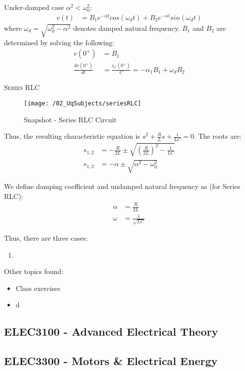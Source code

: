 Under-damped case $\alpha^2 < \omega_0^2$:
\begin{align}
  v(t) &= B_1 e^{-\alpha t} cos (\omega_d t) + B_2 e^{-\alpha t} sin (\omega_d t)
\end{align}
where $\omega_d = \sqrt{\omega_0^2 - \alpha^2}$ denotes damped natural frequency.
$B_1$ and $B_2$ are determined by solving the following:
\begin{align}
  v(0^+) &= B_1 \\
  \frac{dv(0^+)}{dt} &= \frac{i_C(0^+)}{C} = -\alpha_1 B_1 + \omega_d B_2
\end{align}

\textsc{\large Series RLC}\\
\begin{figure}
  \texttt{[image: /02\_UqSubjects/seriesRLC]}
  \caption{Snapshot - Series RLC Circuit}
  \label{fig_seriesRLC}
\end{figure}

Thus, the resulting characteristic equation is $s^2 + \frac{R}{L}s + \frac{1}{LC} = 0$. The roots are:
\begin{align}
  s_{1,2} &= -\frac{R}{2L} \pm \sqrt{(\frac{R}{2L})^2 - \frac{1}{LC}} \\
  s_{1,2} &= -\alpha \pm \sqrt{\alpha^2 - \omega_0^2}
\end{align}

We define damping coefficient and undamped natural frequency as (for Series RLC):
\begin{align}
  \alpha &= \frac{R}{2L} \\
  \omega &= \frac{1}{\sqrt{LC}}
\end{align}

Thus, there are three cases:
\begin{enumerate}
  \item
\end{enumerate}

Other topics found:
\begin{itemize}
  \item Class exercises
  \item d
\end{itemize}

\clearpage

\subsection{ELEC3100 - Advanced Electrical Theory}
\clearpage

\subsection{ELEC3300 - Motors \& Electrical Energy}
\clearpage

